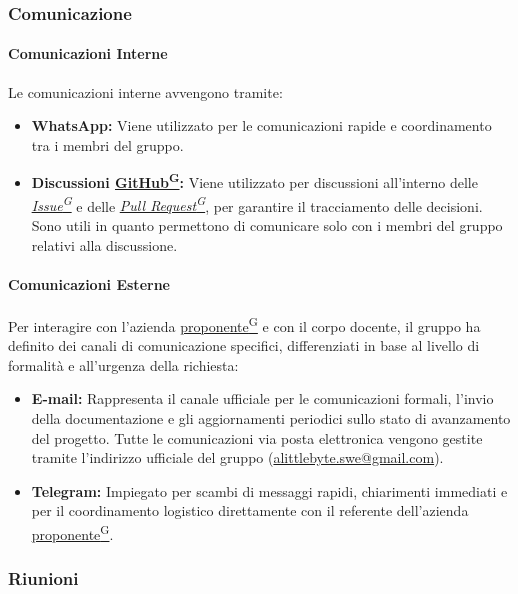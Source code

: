 \documentclass[a4paper,12pt]{article}
\providecommand{\glslink}[2]{\href{https://alittlebyte-19.github.io/Documentazione/glossario.html\#gls-#1}{\underline{#2}\textsuperscript{\scriptsize G}}}
\begin{document}
\subsubsection{Comunicazione}
\paragraph{Comunicazioni Interne}
Le comunicazioni interne avvengono tramite: 
\begin{itemize}
    \item \textbf{WhatsApp:} Viene utilizzato per le comunicazioni rapide e coordinamento tra i membri del gruppo.
    \item \textbf{Discussioni \glslink{github}{GitHub}:} Viene utilizzato per discussioni all'interno delle \textit{\glslink{issue}{Issue}} e delle \textit{\glslink{pull-request}{Pull Request}}, per garantire il tracciamento delle decisioni. Sono utili in quanto permettono di comunicare solo con i membri del gruppo relativi alla discussione. 
\end{itemize}

\paragraph{Comunicazioni Esterne}

Per interagire con l'azienda \glslink{committente-proponente}{proponente} e con il corpo docente, il gruppo ha definito dei canali di comunicazione specifici, differenziati in base al livello di formalità e all'urgenza della richiesta:

\begin{itemize}
    \item \textbf{E-mail:} Rappresenta il canale ufficiale per le comunicazioni formali, l'invio della documentazione e gli aggiornamenti periodici sullo stato di avanzamento del progetto. Tutte le comunicazioni via posta elettronica vengono gestite tramite l'indirizzo ufficiale del gruppo (\url{alittlebyte.swe@gmail.com}).
    
    \item \textbf{Telegram:} Impiegato per scambi di messaggi rapidi, chiarimenti immediati e per il coordinamento logistico direttamente con il referente dell'azienda \glslink{committente-proponente}{proponente}.
\end{itemize}

\subsubsection{Riunioni}
\end{document}
